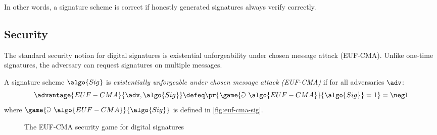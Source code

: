 In other words, a signature scheme is correct if honestly generated signatures always verify correctly.

\subsection{Security}

The standard security notion for digital signatures is existential unforgeability under chosen message attack (EUF-CMA).
Unlike one-time signatures, the adversary can request signatures on multiple messages.

\begin{definition}\label{def:euf-cma}
  A signature scheme $\algo{Sig}$ is \emph{existentially unforgeable under chosen message attack (EUF-CMA)} if for all \ppt adversaries $\adv$:
  \[
    \advantage{EUF-CMA}{\adv, \algo{Sig}} \defeq \pr{\game{\Game~\algo{EUF-CMA}}{\algo{Sig}} = 1} = \negl
  \]
  where $\game{\Game~\algo{EUF-CMA}}{\algo{Sig}}$ is defined in \autoref{fig:euf-cma-sig}.
\end{definition}

\begin{figure}[tbh]
  \begin{tcolorbox}
    \begin{pchstack}[center]
      \pchspace
    \end{pchstack}
  \end{tcolorbox}
  \caption{The EUF-CMA security game for digital signatures}
  \label{fig:euf-cma-sig}
\end{figure}

